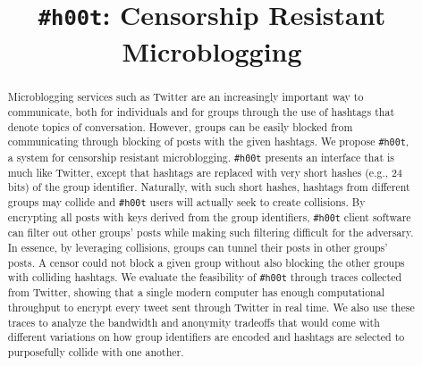 \documentclass{sig-alternate-arxiv}
\newcommand{\hoot}{{\tt \#h00t}\xspace}
\begin{document}
\title{{\huge \hoot}: Censorship Resistant Microblogging}

\maketitle

%
\begin{abstract}

Microblogging services such as Twitter are an increasingly important way
to communicate, both for individuals and for groups through the use of
hashtags that denote topics of conversation. However, groups can be
easily blocked from communicating through blocking of posts with the
	given hashtags. We propose \hoot, a system for censorship resistant
microblogging. \hoot presents an interface that is much like Twitter,
except that hashtags are replaced with very short hashes (e.g., 24 bits)
of the group identifier. Naturally, with such short hashes, hashtags
from different groups may collide and \hoot users will actually seek to
create collisions. By encrypting all posts with keys derived from the
group identifiers, \hoot client software can filter out other groups'
posts while making such filtering difficult for the adversary. In
essence, by leveraging collisions, groups can tunnel their posts in
other groups' posts. A censor could not block a given group without also
blocking the other groups with colliding hashtags.
%
%
We evaluate the feasibility of \hoot through traces collected from
Twitter, showing that a single modern computer has enough computational
throughput to encrypt every tweet sent through Twitter in real time. We
also use these traces to analyze the bandwidth and anonymity tradeoffs
that would come with different variations on how group identifiers are
encoded and hashtags are selected to purposefully collide with one
another.
%

\end{abstract}
\end{document}
